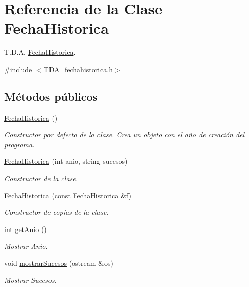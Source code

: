 \hypertarget{classFechaHistorica}{}\section{Referencia de la Clase Fecha\+Historica}
\label{classFechaHistorica}


T.\+D.\+A. \hyperlink{classFechaHistorica}{Fecha\+Historica}.  




{\ttfamily \#include $<$T\+D\+A\+\_\+fechahistorica.\+h$>$}

\subsection*{Métodos públicos}
\begin{DoxyCompactItemize}
\item 
\hyperlink{classFechaHistorica_a35baa09e365240e567049a7e33a7c209}{Fecha\+Historica} ()
\begin{DoxyCompactList}\small\item\em Constructor por defecto de la clase. Crea un objeto con el año de creación del programa. \end{DoxyCompactList}\item 
\hyperlink{classFechaHistorica_a81a9cdafd24a7e649f239754cc6d6317}{Fecha\+Historica} (int anio, string sucesos)
\begin{DoxyCompactList}\small\item\em Constructor de la clase. \end{DoxyCompactList}\item 
\hyperlink{classFechaHistorica_a40a9c133a139d41bf84406e09022feaf}{Fecha\+Historica} (const \hyperlink{classFechaHistorica}{Fecha\+Historica} \&f)
\begin{DoxyCompactList}\small\item\em Constructor de copias de la clase. \end{DoxyCompactList}\item 
int \hyperlink{classFechaHistorica_a01571b2634e50317689912fc3df9cf81}{get\+Anio} ()
\begin{DoxyCompactList}\small\item\em Mostrar Anio. \end{DoxyCompactList}\item 
void \hyperlink{classFechaHistorica_a5c1a1d6cf44b8a1414d6d682479e377a}{mostrar\+Sucesos} (ostream \&os)
\begin{DoxyCompactList}\small\item\em Mostrar Sucesos. \end{DoxyCompactList}\item 

\end{DoxyCompactItemize}
